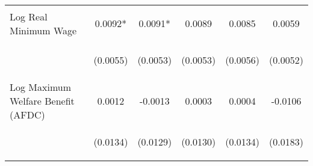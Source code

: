 \begin{center}
\begin{tabular}{lccccc}
\noalign{\smallskip}Log Real Minimum Wage & \begin{scriptsize}0.0092*\end{scriptsize} & \begin{scriptsize}0.0091*\end{scriptsize} & \begin{scriptsize}0.0089\end{scriptsize} & \begin{scriptsize}0.0085\end{scriptsize} & \begin{scriptsize}0.0059\end{scriptsize}\\
 & \begin{scriptsize}(0.0055)\end{scriptsize} & \begin{scriptsize}(0.0053)\end{scriptsize} & \begin{scriptsize}(0.0053)\end{scriptsize} & \begin{scriptsize}(0.0056)\end{scriptsize} & \begin{scriptsize}(0.0052)\end{scriptsize}\\
\noalign{\smallskip}Log Maximum Welfare Benefit (AFDC) & \begin{scriptsize}0.0012\end{scriptsize} & \begin{scriptsize}-0.0013\end{scriptsize} & \begin{scriptsize}0.0003\end{scriptsize} & \begin{scriptsize}0.0004\end{scriptsize} & \begin{scriptsize}-0.0106\end{scriptsize}\\
 & \begin{scriptsize}(0.0134)\end{scriptsize} & \begin{scriptsize}(0.0129)\end{scriptsize} & \begin{scriptsize}(0.0130)\end{scriptsize} & \begin{scriptsize}(0.0134)\end{scriptsize} & \begin{scriptsize}(0.0183)\end{scriptsize}\\

\end{tabular}
\end{center}
